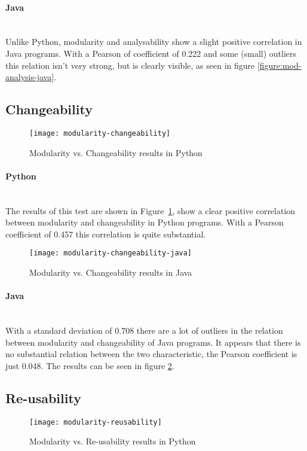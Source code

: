 \documentclass[twoside]{uva-inf-bachelor-thesis}
\newcommand{\myparagraph}[1]{\paragraph{#1}\mbox{}\\}
\begin{document}
\myparagraph{Java}
Unlike Python, modularity and analysability show a slight positive correlation in Java programs. With a Pearson of coefficient of 0.222 and some (small) outliers this relation isn't very strong, but is clearly visible, as seen in figure \ref{figure:mod-analysis-java}.

\subsection{Changeability}

\begin{figure}[H]
    \caption{Modularity vs. Changeability results in Python}
    \label{figure:mod-change}
    \centering
        \texttt{[image: modularity-changeability]}
\end{figure}

\myparagraph{Python}
The results of this test are shown in Figure~\ref{figure:mod-change},  show a clear positive correlation between modularity and changeability in Python programs. With a Pearson coefficient of 0.457 this correlation is  quite substantial.

\begin{figure}[H]
    \caption{Modularity vs. Changeability results in Java}
    \label{figure:mod-change-java}
    \centering
        \texttt{[image: modularity-changeability-java]}
\end{figure}

\myparagraph{Java}
With a standard deviation of 0.708 there are a  lot of outliers in the relation between modularity and changeability of Java programs. It appears that there is no substantial relation between the two characteristic, the Pearson coefficient is just 0.048. The results can be seen in figure \ref{figure:mod-change-java}.

\subsection{Re-usability}

\begin{figure}[H]
    \caption{Modularity vs. Re-usability results in Python}
    \label{figure:mod-reuse}
    \centering
        \texttt{[image: modularity-reusability]}
\end{figure}
\end{document}
